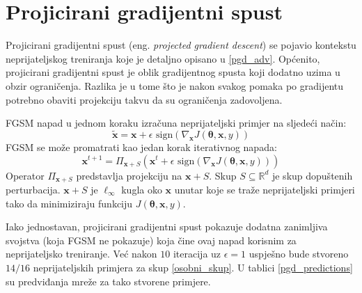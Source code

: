 \documentclass[utf8, diplomski]{fer}
\begin{document}
\section{Projicirani gradijentni spust} Projicirani gradijentni spust (eng. \textit{projected gradient descent}) se pojavio kontekstu neprijateljskog treniranja koje je detaljno opisano u \ref{pgd_adv}. Općenito, projicirani gradijentni spust je oblik gradijentnog spusta koji dodatno uzima u obzir ograničenja. Razlika je u tome što je nakon svakog pomaka po gradijentu potrebno obaviti projekciju takvu da su ograničenja zadovoljena. \par 
FGSM napad u jednom koraku izračuna neprijateljski primjer na sljedeći način:
\begin{equation}
	\boldsymbol{\tilde{x}} = \boldsymbol{x} + \epsilon \text{ sign}(\nabla_{\boldsymbol{x}} J(\boldsymbol{\theta}, \boldsymbol{x}, y)) 
\end{equation}
FGSM se može promatrati kao jedan korak iterativnog napada:
\begin{equation}
	\boldsymbol{x}^{t+1} = \Pi_{\boldsymbol{x}+S} (\boldsymbol{x}^{t} + \epsilon \text{ sign}(\nabla_{\boldsymbol{x}} J(\boldsymbol{\theta}, \boldsymbol{x}, y)))
\end{equation}
Operator $\Pi_{\boldsymbol{x}+S}$ predstavlja projekciju na $\boldsymbol{x}+S$. Skup $S \subseteq \mathbb{R}^{d}$ je skup dopuštenih perturbacija. $\boldsymbol{x}+S$ je $\ell_{\infty}$ kugla oko $\boldsymbol{x}$ unutar koje se traže neprijateljski primjeri tako da minimiziraju funkciju $J(\boldsymbol{\theta}, \boldsymbol{x}, y)$. \par

Iako jednostavan, projicirani gradijentni spust pokazuje dodatna zanimljiva svojstva (koja FGSM ne pokazuje) koja čine ovaj napad korisnim za neprijateljsko treniranje. Već nakon $10$ iteracija uz $\epsilon = 1$ uspješno bude stvoreno $14/16$ neprijateljskih primjera za skup \ref{osobni_skup}. U tablici \ref{pgd_predictions} su predviđanja mreže za tako stvorene primjere. 
\end{document}
